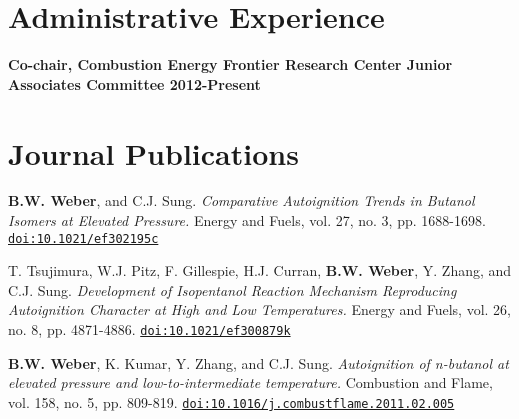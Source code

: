 \documentclass[margin,line]{res}
\newcommand*{\doi}[1]{\href{http://dx.doi.org/#1}{\nolinkurl{doi:#1}}}
\newenvironment{list3}{
  \begin{list}{\ding{113}}{%
      \setlength{\itemsep}{0.1in}
      \setlength{\parsep}{0in} \setlength{\parskip}{0in}
      \setlength{\topsep}{0in} \setlength{\partopsep}{0in} 
      \setlength{\leftmargin}{0in}}}{\end{list}}
\begin{document}
\begin{resume}
\section{\sc Administrative Experience}
{\bf Co-chair, Combustion Energy Frontier Research Center Junior Associates Committee \hfill 2012-Present}
%
%
%

\section{\sc Journal Publications}
\begin{list3}
\item[] {\bf B.W. Weber}, and C.J. Sung. {\em Comparative Autoignition Trends in Butanol Isomers at Elevated Pressure.} Energy and Fuels, vol. 27, no. 3, pp. 1688-1698. \doi{10.1021/ef302195c}
\item[] T. Tsujimura, W.J. Pitz, F. Gillespie, H.J. Curran, {\bf B.W. Weber}, Y. Zhang, and C.J. Sung. {\em Development of Isopentanol Reaction Mechanism Reproducing Autoignition Character at High and Low Temperatures.} Energy and Fuels, vol. 26, no. 8, pp. 4871-4886. \doi{10.1021/ef300879k}
\item[] {\bf B.W. Weber}, K. Kumar, Y. Zhang, and C.J. Sung. {\em Autoignition of n-butanol at elevated pressure and low-to-intermediate temperature.} Combustion and Flame, vol. 158, no. 5, pp. 809-819. \doi{10.1016/j.combustflame.2011.02.005}
\end{list3}


\end{resume}
\end{document}
